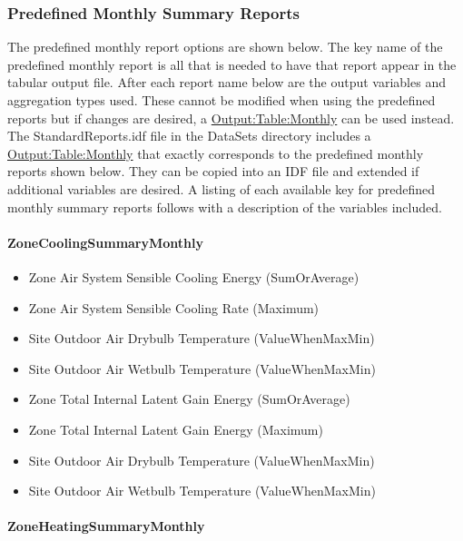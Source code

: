 \subsubsection{Predefined Monthly Summary Reports}\label{predefined-monthly-summary-reports}

The predefined monthly report options are shown below. The key name of the predefined monthly report is all that is needed to have that report appear in the tabular output file. After each report name below are the output variables and aggregation types used. These cannot be modified when using the predefined reports but if changes are desired, a \hyperref[outputtablemonthly]{Output:Table:Monthly} can be used instead. The StandardReports.idf file in the DataSets directory includes a \hyperref[outputtablemonthly]{Output:Table:Monthly} that exactly corresponds to the predefined monthly reports shown below. They can be copied into an IDF file and extended if additional variables are desired. A listing of each available key for predefined monthly summary reports follows with a description of the variables included.

\paragraph{ZoneCoolingSummaryMonthly}\label{zonecoolingsummarymonthly}

\begin{itemize}
\item
  Zone Air System Sensible Cooling Energy (SumOrAverage)
\item
  Zone Air System Sensible Cooling Rate (Maximum)
\item
  Site Outdoor Air Drybulb Temperature (ValueWhenMaxMin)
\item
  Site Outdoor Air Wetbulb Temperature (ValueWhenMaxMin)
\item
  Zone Total Internal Latent Gain Energy (SumOrAverage)
\item
  Zone Total Internal Latent Gain Energy (Maximum)
\item
  Site Outdoor Air Drybulb Temperature (ValueWhenMaxMin)
\item
  Site Outdoor Air Wetbulb Temperature (ValueWhenMaxMin)
\end{itemize}

\paragraph{ZoneHeatingSummaryMonthly}\label{zoneheatingsummarymonthly}

